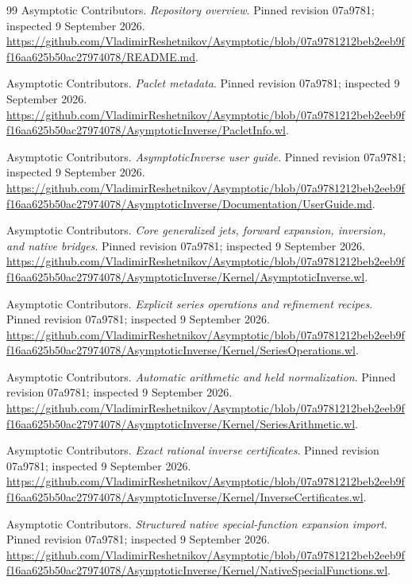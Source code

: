\begin{thebibliography}{99}
Asymptotic Contributors. \emph{Repository overview}. Pinned revision 07a9781; inspected 9 September 2026.
\url{https://github.com/VladimirReshetnikov/Asymptotic/blob/07a9781212beb2eeb9ff16aa625b50ac27974078/README.md}.

Asymptotic Contributors. \emph{Paclet metadata}. Pinned revision 07a9781; inspected 9 September 2026.
\url{https://github.com/VladimirReshetnikov/Asymptotic/blob/07a9781212beb2eeb9ff16aa625b50ac27974078/AsymptoticInverse/PacletInfo.wl}.

Asymptotic Contributors. \emph{AsymptoticInverse user guide}. Pinned revision 07a9781; inspected 9 September 2026.
\url{https://github.com/VladimirReshetnikov/Asymptotic/blob/07a9781212beb2eeb9ff16aa625b50ac27974078/AsymptoticInverse/Documentation/UserGuide.md}.

Asymptotic Contributors. \emph{Core generalized jets, forward expansion, inversion, and native bridges}. Pinned revision 07a9781; inspected 9 September 2026.
\url{https://github.com/VladimirReshetnikov/Asymptotic/blob/07a9781212beb2eeb9ff16aa625b50ac27974078/AsymptoticInverse/Kernel/AsymptoticInverse.wl}.

Asymptotic Contributors. \emph{Explicit series operations and refinement recipes}. Pinned revision 07a9781; inspected 9 September 2026.
\url{https://github.com/VladimirReshetnikov/Asymptotic/blob/07a9781212beb2eeb9ff16aa625b50ac27974078/AsymptoticInverse/Kernel/SeriesOperations.wl}.

Asymptotic Contributors. \emph{Automatic arithmetic and held normalization}. Pinned revision 07a9781; inspected 9 September 2026.
\url{https://github.com/VladimirReshetnikov/Asymptotic/blob/07a9781212beb2eeb9ff16aa625b50ac27974078/AsymptoticInverse/Kernel/SeriesArithmetic.wl}.

Asymptotic Contributors. \emph{Exact rational inverse certificates}. Pinned revision 07a9781; inspected 9 September 2026.
\url{https://github.com/VladimirReshetnikov/Asymptotic/blob/07a9781212beb2eeb9ff16aa625b50ac27974078/AsymptoticInverse/Kernel/InverseCertificates.wl}.

Asymptotic Contributors. \emph{Structured native special-function expansion import}. Pinned revision 07a9781; inspected 9 September 2026.
\url{https://github.com/VladimirReshetnikov/Asymptotic/blob/07a9781212beb2eeb9ff16aa625b50ac27974078/AsymptoticInverse/Kernel/NativeSpecialFunctions.wl}.


\end{thebibliography}
